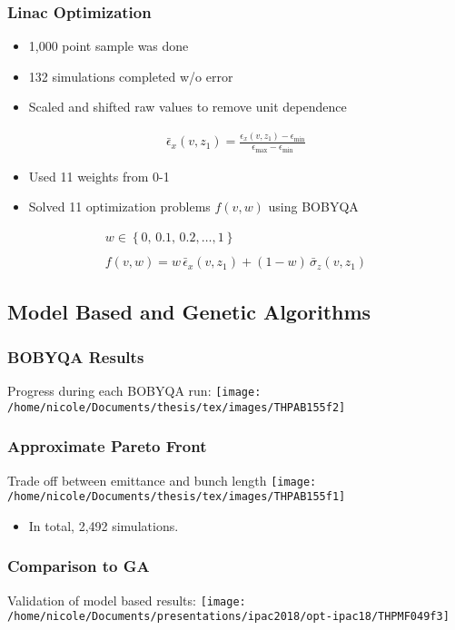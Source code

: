 \documentclass[professionalfonts,t]{beamer}
\begin{document}
\begin{frame}
\frametitle{Linac Optimization}
\begin{itemize}
\item{1,000 point sample was done}
\item{132 simulations completed w/o error}
\item{Scaled and shifted raw values to remove unit dependence}
\end{itemize}
\begin{align*}
\bar{\epsilon}_x (v,z_1) = \frac{ \epsilon_x (v,z_1) - \epsilon_{\min} } { \epsilon_{\max} - \epsilon_{\min} }
\end{align*}

\begin{itemize}
\item{Used 11 weights from 0-1}
\item{Solved 11 optimization problems $f(v,w)$ using BOBYQA}
\end{itemize}
\begin{gather*}
w\in\left\{ 0, \,0.1, \,0.2, \ldots, 1 \right\}\\ \\
f(v,w) = w \,\bar{\epsilon}_x(v,z_1) + (1-w)\, \bar{\sigma}_z(v,z_1)
\end{gather*}
\end{frame}

\subsection{Model Based and Genetic Algorithms}
\begin{frame}
\frametitle{BOBYQA Results}
Progress during each BOBYQA run:
\centering
\texttt{[image: /home/nicole/Documents/thesis/tex/images/THPAB155f2]}
\end{frame}

\begin{frame}
\frametitle{Approximate Pareto Front}
\centering
Trade off between emittance and bunch length
\texttt{[image: /home/nicole/Documents/thesis/tex/images/THPAB155f1]}
\begin{itemize}
\item In total, 2,492 simulations.
\end{itemize}
\end{frame}


\begin{frame}
	\frametitle{Comparison to GA}
	Validation of model based results:
	\centering
	\texttt{[image: /home/nicole/Documents/presentations/ipac2018/opt-ipac18/THPMF049f3]}
\end{frame}
\end{document}
